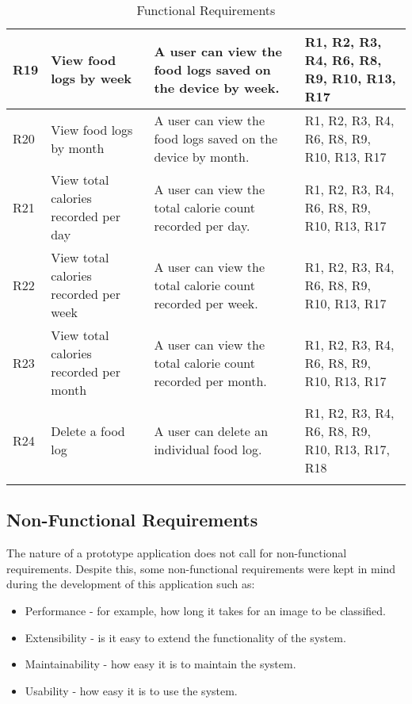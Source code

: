 \begin{longtable}{|p{.75cm}|p{3.5cm}|p{6cm}|p{2.5cm}|}
R19         & View food logs by week                                      & A user can view the food logs saved on the device by week.                                              & R1, R2, R3, R4, R6, R8, R9, R10, R13, R17      \\ \hline
R20         & View food logs by month                                     & A user can view the food logs saved on the device by month.                                             & R1, R2, R3, R4, R6, R8, R9, R10, R13, R17      \\ \hline
R21         & View total calories recorded per day                        & A user can view the total calorie count recorded per day.                                               & R1, R2, R3, R4, R6, R8, R9, R10, R13, R17      \\ \hline
R22         & View total calories recorded per week                       & A user can view the total calorie count recorded per week.                                              & R1, R2, R3, R4, R6, R8, R9, R10, R13, R17      \\ \hline
R23         & View total calories recorded per month                      & A user can view the total calorie count recorded per month.                                             & R1, R2, R3, R4, R6, R8, R9, R10, R13, R17      \\ \hline
R24         & Delete a food log                                           & A user can delete an individual food log.                                                               & R1, R2, R3, R4, R6, R8, R9, R10, R13, R17, R18 \\ \hline
\caption{Functional Requirements}
\label{requirements}
\end{longtable}

\tocless\subsection{Non-Functional Requirements}
The nature of a prototype application does not call for non-functional requirements.
Despite this, some non-functional requirements were kept in mind during the development of this application such as:
\begin{itemize}
	\item{Performance - for example, how long it takes for an image to be classified.}
	\item{Extensibility - is it easy to extend the functionality of the system.}
	\item{Maintainability - how easy it is to maintain the system.}
	\item{Usability - how easy it is to use the system.}
\end{itemize}

\clearpage